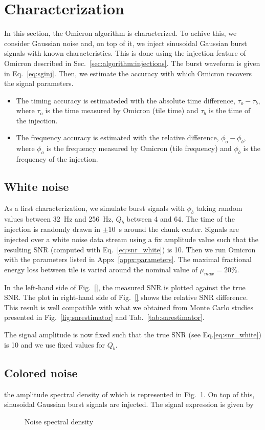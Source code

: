 \section{Characterization} \label{sec:characterization}

In this section, the Omicron algorithm is characterized. To achive this, we consider Gaussian noise and, on top of it, we inject sinusoidal Gaussian burst signals with known characteristics. This is done using the injection feature of Omicron described in Sec.~\ref{sec:algorithm:injections}. The burst waveform is given in Eq.~\ref{eq:sginj}. Then, we estimate the accuracy with which Omicron recovers the signal parameters.
\begin{itemize}
\item The timing accuracy is estimateded with the absolute time difference, $\tau_o-\tau_b$, where $\tau_o$ is the time measured by Omicron (tile time) and $\tau_b$ is the time of the injection.
\item The frequency accuracy is estimated with the relative difference, $\phi_o-\phi_b$, where $\phi_o$ is the frequency measured by Omicron (tile frequency) and $\phi_b$ is the frequency of the injection.
\end{itemize}



\subsection{White noise} \label{sec:characterization:white}
As a first characterization, we simulate burst signals with $\phi_b$ taking random values between 32~Hz and 256~Hz, $Q_b$ between 4 and 64. The time of the injection is randomly drawn in $\pm10$~s around the chunk center. Signals are injected over a white noise data stream using a fix amplitude value such that the resulting SNR (computed with Eq.~\ref{eq:snr_white}) is 10. Then we run Omicron with the parameters listed in Appx~\ref{appx:parameters}. The maximal fractional energy loss between tile is varied around the nominal value of $\mu_{max}=20\%$. 


In the left-hand side of Fig.~\ref{}, the measured SNR is plotted against the true SNR. The plot in right-hand side of Fig.~\ref{} shows the relative SNR difference. This result is well compatible with what we obtained from Monte Carlo studies presented in Fig.~\ref{fig:snrestimator} and Tab.~\ref{tab:snrestimator}.

The signal amplitude is now fixed such that the true SNR (see Eq.\ref{eq:snr_white}) is 10 and we use fixed values for $Q_b$. 

\subsection{Colored noise} \label{sec:characterization:colored}

the amplitude spectral density of which is represented in Fig.~\ref{fig:noise_asd}. On top of this, sinusoidal Gaussian burst signals are injected. The signal expression is given by 
\begin{figure}
  \center
  \caption{Noise spectral density}
  \label{fig:noise_asd}
\end{figure}
